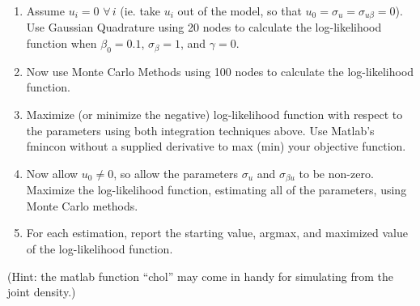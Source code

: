 \documentclass[10pt]{article}
\begin{document}
\begin{enumerate}
	\item Assume $u_i=0\,\,\forall\,i$ (ie. take $u_i$ out of the model, so that $u_0=\sigma_u=\sigma_{u\beta}=0$). Use Gaussian Quadrature using 20 nodes to calculate the log-likelihood function when $\beta_0=0.1$, $\sigma_{\beta}=1$, and $\gamma=0$.
	\item Now use Monte Carlo Methods using 100 nodes to calculate the log-likelihood function. 
	\item Maximize (or minimize the negative) log-likelihood function with respect to the parameters using both integration techniques above. Use Matlab's fmincon without a supplied derivative to max (min) your objective function. 
	\item Now allow $u_0\ne0$, so allow the parameters $\sigma_u$ and $\sigma_{\beta u}$ to be non-zero. Maximize the log-likelihood function, estimating all of the parameters, using Monte Carlo methods.
	\item For each estimation, report the starting value, argmax, and maximized value of the log-likelihood function.
\end{enumerate}

\vspace{2em}
(Hint: the matlab function ``chol'' may come in handy for simulating from the joint density.) 
\end{document}
